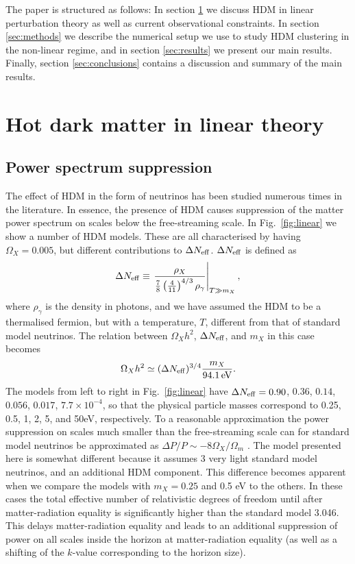 \documentclass[11pt,a4paper]{article}
\renewcommand\({\left(}
\renewcommand\){\right)}
\renewcommand\[{\left[}
\renewcommand\]{\right]}
\begin{document}
The paper is structured as follows: In section \ref{sec:linear_theory} we discuss HDM in linear perturbation theory as well as current observational constraints. In section \ref{sec:methods} we describe the numerical setup we use to study HDM clustering in the non-linear regime, and in section \ref{sec:results} we present our main results. Finally, section \ref{sec:conclusions} contains a discussion and summary of the main results.

\section{Hot dark matter in linear theory}\label{sec:linear_theory}

\subsection{Power spectrum suppression}
The effect of HDM in the form of neutrinos has been studied numerous times in the literature. In essence, the presence of HDM causes suppression of the matter power spectrum on scales below the free-streaming scale. In Fig.~\ref{fig:linear} we show a number of HDM models. These are all characterised by having $\Omega_X = 0.005$, but different contributions to $\Delta N_{\rm eff}$. $\Delta N_{\rm eff}$ is defined as
\begin{equation}
\Delta N_{\rm eff} \equiv \left. \frac{\rho_X}{\frac{7}{8} \left(\frac{4}{11}\right)^{4/3} \rho_\gamma} \right|_{T \gg m_X},
\end{equation}
where $\rho_\gamma$ is the density in photons, and we have assumed the HDM to be a thermalised fermion, but with a temperature, $T$, different from that of standard model neutrinos. The relation between $\Omega_X h^2$, $\Delta N_{\rm eff}$, and $m_X$ in this case becomes
\begin{equation}
\Omega_X h^2 \simeq (\Delta N_{\rm eff})^{3/4} \frac{m_X}{94.1 \, {\rm eV}}.
\end{equation}
The models from left to right in Fig.~\ref{fig:linear} have $\Delta N_{\rm eff} = 0.90$, $0.36$, $0.14$, $0.056$, $0.017$, $7.7 \times 10^{-4}$, so that the physical particle masses correspond to 0.25, 0.5, 1, 2, 5, and 50eV, respectively.
To a reasonable approximation the power suppression on scales much smaller than the free-streaming scale can for standard model neutrinos be approximated as $\Delta P/P \sim -8 \Omega_X/\Omega_m$ \cite{Hu:1997mj,Lesgourgues:2006nd,Hannestad:2006zg,Wong:2011ip}.
The model presented here is somewhat different because it assumes 3 very light standard model neutrinos, and an additional HDM component.
This difference becomes apparent when we compare the models with $m_X = 0.25$ and 0.5 eV to the others. In these cases the total effective number of relativistic degrees of freedom until after matter-radiation equality is significantly higher than the standard model 3.046. This delays matter-radiation equality and leads to an additional suppression of power on all scales inside the horizon at matter-radiation equality (as well as a shifting of the $k$-value corresponding to the horizon size).
\end{document}
